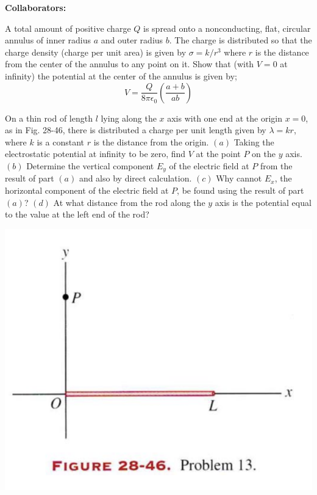 \documentclass[11pt,letterpaper,boxed]{hmcpset}
\begin{document}
\noindent\textbf{Collaborators:} 


\begin{problem}
A total amount of positive charge $Q$ is spread onto a nonconducting, flat, circular annulus of inner radius $a$ and outer radius $b$. The charge is distributed so that the charge density (charge per unit area) is given by $\sigma = k/r^3$ where $r$ is the distance from the center of the annulus to any point on it. Show that (with $V=0$ at infinity) the potential at the center of the annulus is given by; 
$$ V= \frac{Q}{8\pi \epsilon_0}\left( \frac{a+b}{ab}\right)$$
\end{problem}

\begin{solution}
\vfill
\end{solution}
\newpage

\begin{problem}[HRK 28.13]
On a thin rod of length $l$ lying along the $x$ axis with one end at the origin $x=0$, as in Fig. 28-46, there is distributed a charge per unit length given by $\lambda =kr$, where $k$ is a constant $r$ is the distance from the origin. $(a)$ Taking the electrostatic potential at infinity to be zero, find $V$ at the point $P$ on the $y$ axis. $(b)$ Determine the vertical component $E_y$ of the electric field at $P$ from the result of part $(a)$ and also by direct calculation. $(c)$ Why cannot $E_x$, the horizontal component of the electric field at $P$, be found using the result of part $(a)$? $(d)$ At what distance from the rod along the  $y$ axis is the potential equal to the value at the left end of the rod?
\begin{center}
\includegraphics[scale=0.6]{28-46.png}
\end{center}
\end{problem}
\end{document}
